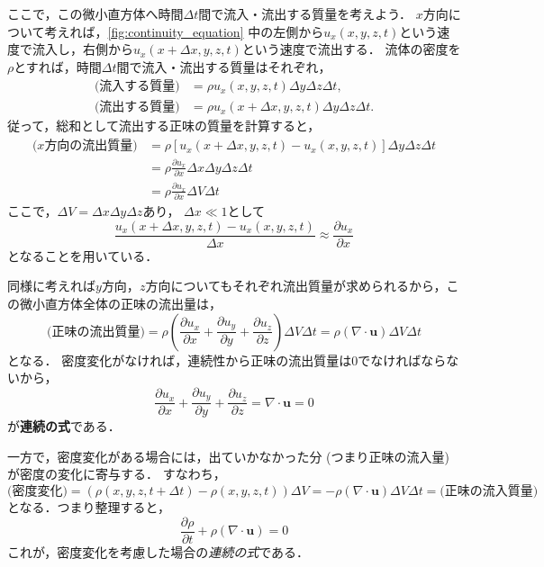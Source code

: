 \documentclass[uplatex,dvipdfmx,a4j,11pt]{jsreport}
\newcommand{\keyword}[1]{\textcolor{mainblue}{\textbf{#1}}}
\numberwithin{equation}{chapter}
\begin{document}
ここで，この微小直方体へ時間$\Delta t$間で流入・流出する質量を考えよう．
$x$方向について考えれば，\cref{fig:continuity_equation} 中の左側から$u_x(x,y,z,t)$という速度で流入し，右側から$u_x(x+\Delta x,y,z,t)$という速度で流出する．
流体の密度を$\rho$とすれば，時間$\Delta t$間で流入・流出する質量はそれぞれ，
\begin{align*}
  \text{(流入する質量)} &= \rho u_x(x,y,z,t) \Delta y \Delta z \Delta t,\\
  \text{(流出する質量)} &= \rho u_x(x+\Delta x,y,z,t) \Delta y \Delta z \Delta t.
\end{align*}
従って，総和として流出する正味の質量を計算すると，
\begin{align*}
  \text{($x$方向の流出質量)} &= \rho \left[u_x(x+\Delta x,y,z,t) - u_x(x,y,z,t)\right] \Delta y \Delta z \Delta t \\
  &= \rho \frac{\partial u_x}{\partial x} \Delta x \Delta y \Delta z \Delta t\\
  &= \rho \frac{\partial u_x}{\partial x} \Delta V \Delta t
\end{align*}
ここで，$\Delta V = \Delta x \Delta y \Delta z$あり，
$\Delta x \ll 1$として
\begin{equation*}
  \frac{u_x(x+\Delta x,y,z,t) - u_x(x,y,z,t)}{\Delta x} \approx \frac{\partial u_x}{\partial x}
\end{equation*}
となることを用いている．

同様に考えれば$y$方向，$z$方向についてもそれぞれ流出質量が求められるから，この微小直方体全体の正味の流出量は，
\begin{equation}
  \text{(正味の流出質量)} = \rho \left(\frac{\partial u_x}{\partial x} + \frac{\partial u_y}{\partial y} + \frac{\partial u_z}{\partial z}\right) \Delta V \Delta t = \rho (\nabla \cdot \mathbf{u}) \Delta V \Delta t
\end{equation}
となる．
密度変化がなければ，連続性から正味の流出質量は0でなければならないから，
\begin{equation}
  \frac{\partial u_x}{\partial x} + \frac{\partial u_y}{\partial y} + \frac{\partial u_z}{\partial z} = \nabla \cdot \mathbf{u} = 0
  \label{eq:incompressible_continuity}
\end{equation}
が\keyword{連続の式}である．

一方で，密度変化がある場合には，出ていかなかった分 (つまり正味の流入量) が密度の変化に寄与する．
すなわち，
\begin{equation*}
  \text{(密度変化)} = 
  \left(\rho(x, y, z, t + \Delta t) - \rho(x, y, z, t)\right)\Delta V = -\rho (\nabla \cdot \mathbf{u}) \Delta V \Delta t = \text{(正味の流入質量)}
\end{equation*}
となる．つまり整理すると，
\begin{equation}
  \frac{\partial \rho}{\partial t} + \rho (\nabla \cdot \mathbf{u}) = 0
  \label{eq:compressible_continuity}
\end{equation}
これが，密度変化を考慮した場合の\emph{連続の式}である．
\end{document}
